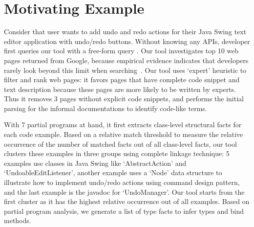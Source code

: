 
\section{Motivating Example}

Consider that user wants to add undo and redo actions for their Java Swing text editor application with undo/redo buttons.  Without knowing any APIs, developer  first queries our tool with a free-form query . Our tool investigates top 10 web pages returned from Google, because empirical evidence indicates that developers rarely look beyond this limit when searching~\cite{Starke:searchNum09}. Our tool uses `expert' heuristic to filter and rank web pages: it favors pages that have complete code snippet and text description because these pages are more likely to be written by experts. Thus it removes 3 pages without explicit code snippets, and performs the initial parsing for the informal documentations to identify code-like terms. 


 With 7  partial programs at hand, it first extracts class-level structural facts for each code example. Based on a relative match threshold to measure the relative occurrence of the number of matched facts out of all class-level facts,  our tool clusters these examples in three groups using complete linkage technique: 5 examples use classes in Java Swing like `AbstractAction' and `UndoableEditListener', another example uses a `Node' data structure to illustrate how to implement undo/redo actions using command design pattern, and the last example is the javadoc for `UndoManager'.  Our tool starts from the first cluster as it has the highest relative occurrence out of all examples. Based on partial program analysis, we generate a list of type facts to infer types and bind methods.

